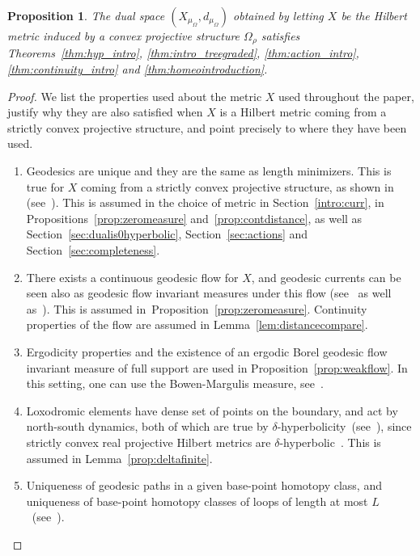 \documentclass[12pt,article]{amsart}
\numberwithin{equation}{section}
\numberwithin{figure}{section}
\newtheorem{proposition}[equation]{Proposition}
\theoremstyle{definition}
\theoremstyle{plain}
\begin{document}
 \begin{proposition}
   The dual space $(X_{\mu_{\Omega}}, d_{\mu_{\Omega}})$ obtained by letting $X$ be the Hilbert metric induced by a convex projective structure $\Omega_{\rho}$ satisfies Theorems~\ref{thm:hyp_intro}, \ref{thm:intro_treegraded}, \ref{thm:action_intro}, \ref{thm:continuity_intro} and \ref{thm:homeointroduction}.

   \label{prop:general}
   \end{proposition}
\begin{proof}
We list the properties used about the metric $X$ used throughout the paper, justify why they are also satisfied when $X$ is a Hilbert metric coming from a strictly convex projective structure, and point precisely to where they have been used. 

\begin{enumerate}
    \item Geodesics are unique and they are the same as length minimizers. This is true for $X$ coming from a strictly convex projective structure, as shown in  (see~\cite{Bea99:HilbertDomain}). This is assumed in the choice of metric in Section~\ref{intro:curr}, in Propositions~\ref{prop:zeromeasure} and~\ref{prop:contdistance}, as well as Section~\ref{sec:dualis0hyperbolic}, Section~\ref{sec:actions} and Section~\ref{sec:completeness}.
    \item There exists a continuous geodesic flow for $X$, and geodesic currents can be seen also as geodesic flow invariant measures under this flow (see~\cite[Section~6]{KP14:Convex} as well as~\cite[Chapter~4]{Cra11:Dynamics}). This is assumed in~Proposition~\ref{prop:zeromeasure}. Continuity properties of the flow are assumed in Lemma~\ref{lem:distancecompare}. \item Ergodicity properties and the existence of an ergodic Borel geodesic flow invariant measure of full support are used in Proposition~\ref{prop:weakflow}. In this setting, one can use the Bowen-Margulis measure, see~\cite[4.2]{Cra11:Dynamics}.
    \item Loxodromic elements have dense set of points on the boundary, and act by north-south dynamics, both of which are true by $\delta$-hyperbolicity~(see~\cite[Chapter~11, Proposition~2.4]{CDR90:NotesGroupes}), since strictly convex real projective Hilbert metrics are $\delta$-hyperbolic~\cite[Theorem~4.5]{Ben04:Convexes}. This is assumed in Lemma~\ref{prop:deltafinite}. 
    \item Uniqueness of geodesic paths in a given base-point homotopy class, and uniqueness of base-point homotopy classes of loops of length at most $L$~(see~\cite[Page~9]{KP14:Convex}).
\end{enumerate}
 \end{proof}
\end{document}
